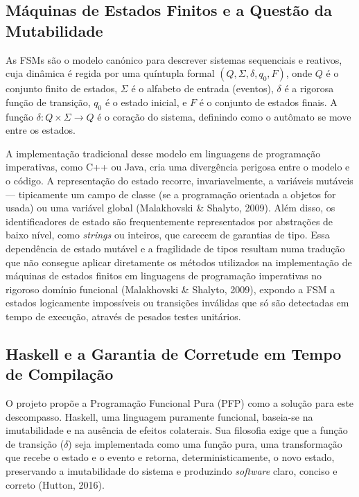 \documentclass[12pt,a4paper]{article}
\begin{document}
\subsection{Máquinas de Estados Finitos e a Questão da Mutabilidade}

As FSMs são o modelo canónico para descrever sistemas sequenciais e reativos, cuja dinâmica é regida por uma quíntupla formal $(Q, \Sigma, \delta, q_0, F)$, onde $Q$ é o conjunto finito de estados, $\Sigma$ é o alfabeto de entrada (eventos), $\delta$ é a rigorosa função de transição, $q_0$ é o estado inicial, e $F$ é o conjunto de estados finais. A função $\delta: Q \times \Sigma \to Q$ é o coração do sistema, definindo como o autômato se move entre os estados.

A implementação tradicional desse modelo em linguagens de programação imperativas, como C++ ou Java, cria uma divergência perigosa entre o modelo e o código. A representação do estado recorre, invariavelmente, a variáveis mutáveis --- tipicamente um campo de classe (se a programação orientada a objetos for usada) ou uma variável global (Malakhovski \& Shalyto, 2009). Além disso, os identificadores de estado são frequentemente representados por abstrações de baixo nível, como \textit{strings} ou inteiros, que carecem de garantias de tipo. Essa dependência de estado mutável e a fragilidade de tipos resultam numa tradução que não consegue aplicar diretamente os métodos utilizados na implementação de máquinas de estados finitos em linguagens de programação imperativas no rigoroso domínio funcional (Malakhovski \& Shalyto, 2009), expondo a FSM a estados logicamente impossíveis ou transições inválidas que só são detectadas em tempo de execução, através de pesados testes unitários.

\subsection{Haskell e a Garantia de Corretude em Tempo de Compilação}
O projeto propõe a Programação Funcional Pura (PFP) como a solução para este descompasso. Haskell, uma linguagem puramente funcional, baseia-se na imutabilidade e na ausência de efeitos colaterais. Sua filosofia exige que a função de transição ($\delta$) seja implementada como uma função pura, uma transformação que recebe o estado e o evento e retorna, deterministicamente, o novo estado, preservando a imutabilidade do sistema e produzindo \textit{software} claro, conciso e correto (Hutton, 2016).
\end{document}
